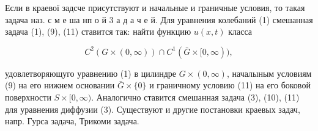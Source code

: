 \documentclass[10pt]{article}
\begin{document}
Если в краевої задсче присутствуют и начальные и граничные условия, то такая задача наз. с м е ша нп о й 3 а д а ч е й. Для уравнения колебаний (1) смешанная задача (1), (9), (11) ставится так: найти функцию $u(x, t)$ класса



\[

C^{2}(G \times(0, \infty)) \cap C^{1}(\bar{G} \times[0, \infty)),

\]



удовлетворяющуго уравнению (1) в цилиндре $G \times(0, \infty)$, началыным условиям (9) на его нижнем основании $\bar{G} \times\{0\}$ и граничному условию (11) на его боковой поверхности $S \times[0, \infty)$. Аналогично ставится смешанная задача (3), (10), (11) для уравнения диффузии (3). Существуют и другие постановки краевых задач, напр. Гурса задача, Трикоми задача.
\end{document}
